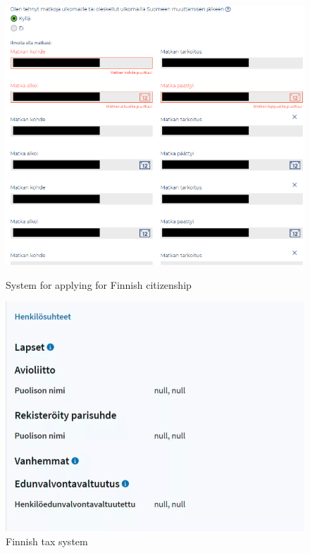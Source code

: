 \begin{figure}
    \caption{System for applying for Finnish citizenship}
    \centering
    \includegraphics[scale=0.35, frame]{figures/enterfinland-ui-citizenship-cant-remove-first-trip.png}
    \label{fig:enterfinland}
\end{figure}

\begin{figure}
    \centering
    \includegraphics[scale=0.45]{figures/finnishSkatteetaten.png}
    \caption{Finnish tax system}
\end{figure}


